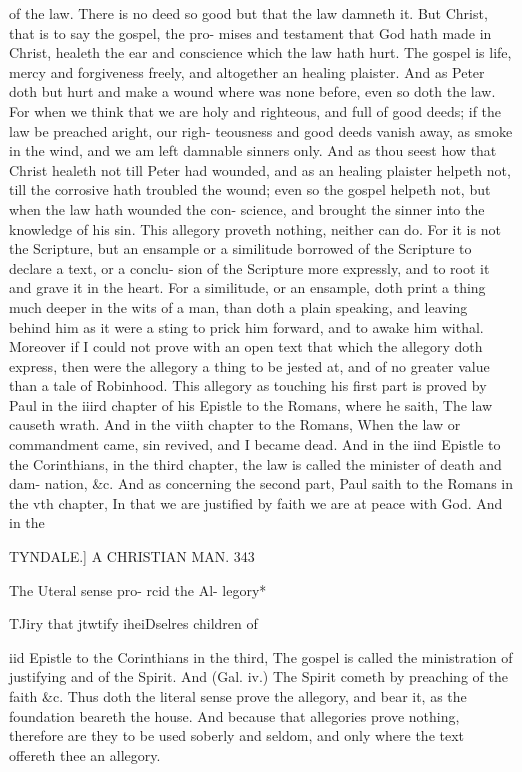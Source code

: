 \documentclass{custom}
\begin{document}
{of the law. There is no deed so good but that the law 
damneth it. But Christ, that is to say the gospel, the pro- 
mises and testament that God hath made in Christ, healeth 
the ear and conscience which the law hath hurt. The 
gospel is life, mercy and forgiveness freely, and altogether 
an healing plaister. And as Peter doth but hurt and 
make a wound where was none before, even so doth the 
law. For when we think that we are holy and righteous, and 
full of good deeds; if the law be preached aright, our righ- 
teousness and good deeds vanish away, as smoke in the 
wind, and we am left damnable sinners only. And as 
thou seest how that Christ healeth not till Peter had 
wounded, and as an healing plaister helpeth not, till the 
corrosive hath troubled the wound; even so the gospel 
helpeth not, but when the law hath wounded the con- 
science, and brought the sinner into the knowledge of his 
sin. This allegory proveth nothing, neither can do. For 
it is not the Scripture, but an ensample or a similitude 
borrowed of the Scripture to declare a text, or a conclu- 
sion of the Scripture more expressly, and to root it and 
grave it in the heart. For a similitude, or an ensample, 
doth print a thing much deeper in the wits of a man, than 
doth a plain speaking, and leaving behind him as it were a 
sting to prick him forward, and to awake him withal. 
Moreover if I could not prove with an open text that 
which the allegory doth express, then were the allegory a 
thing to be jested at, and of no greater value than a tale 
of Robinhood. This allegory as touching his first part is 
proved by Paul in the iiird chapter of his Epistle to the 
Romans, where he saith, The law causeth wrath. And 
in the viith chapter to the Romans, When the law or 
commandment came, sin revived, and I became dead. 
And in the iind Epistle to the Corinthians, in the third 
chapter, the law is called the minister of death and dam- 
nation, &c. And as concerning the second part, Paul 
saith to the Romans in the vth chapter, In that we are 
justified by faith we are at peace with God. And in the 


TYNDALE.]
A CHRISTIAN MAN.
343

The Uteral 
sense pro- 
rcid the Al- 
legory* 

TJiry that 
jtwtify 
iheiDselres 
children of 

iid Epistle to the Corinthians in the third, The gospel is 
called the ministration of justifying and of the Spirit. 
And (Gal. iv.) The Spirit cometh by preaching of the faith 
&c. Thus doth the literal sense prove the allegory, and 
bear it, as the foundation beareth the house. And because 
that allegories prove nothing, therefore are they to be used 
soberly and seldom, and only where the text offereth thee 
an allegory. 

}
\end{document}
